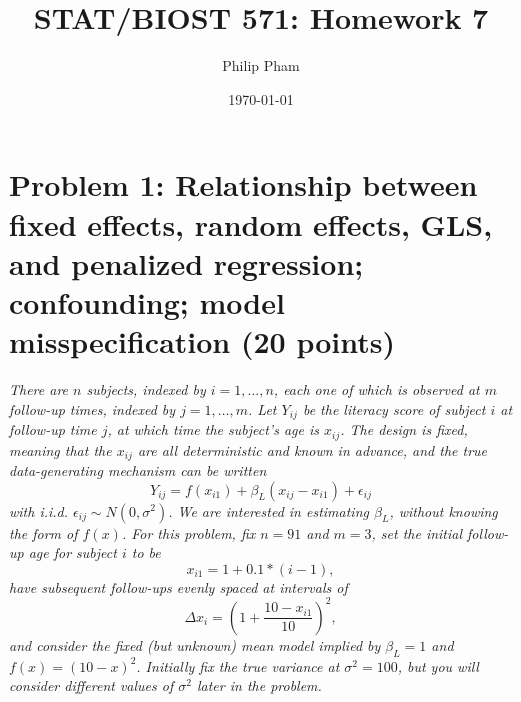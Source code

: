\documentclass[11pt, letterpaper]{article}
\title{STAT/BIOST 571: Homework 7}
\author{Philip Pham}
\date{\today}
\begin{document}
\maketitle

\section*{Problem 1: Relationship between fixed effects, random effects, GLS, and penalized regression; confounding; model misspecification (20 points)} 

{\em There are $n$ subjects, indexed by $i=1,\ldots,n$, each one of which is
  observed at $m$ follow-up times, indexed by $j=1,\ldots,m$.  Let $Y_{ij}$ be
  the literacy score of subject $i$ at follow-up time $j$, at which time the
  subject's age is $x_{ij}$.  The design is fixed, meaning that the $x_{ij}$ are
  all deterministic and known in advance, and the true data-generating mechanism
  can be written
\[
Y_{ij}=f(x_{i1})+\beta_L(x_{ij}-x_{i1})+\epsilon_{ij}
\]
with i.i.d. $\epsilon_{ij}\sim N(0,\sigma^2)$.  We are interested in estimating $\beta_L$,
without knowing the form of $f(x)$.
For this problem, fix $n=91$ and $m=3$, set 
the initial follow-up age for subject $i$ to be 
\[
x_{i1}=1+0.1*(i-1),
\]
have subsequent follow-ups evenly spaced at intervals of 
\[
\Delta x_i = \left(1 + \frac{10-x_{i1}}{10}\right)^2,
\]
and consider the fixed (but unknown) mean model implied by $\beta_L=1$ and  $f(x) = (10-x)^2$.
Initially fix the true variance at $\sigma^2 = 100$, but you will consider different values of $\sigma^2$ later in the problem. }
\end{document}
